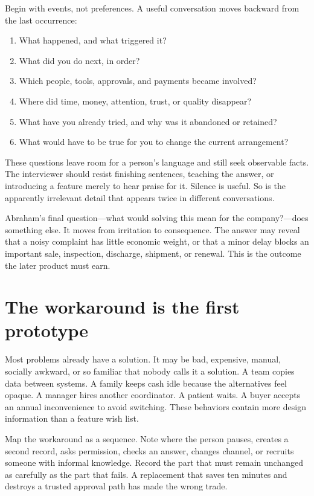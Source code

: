 Begin with events, not preferences. A useful conversation moves backward from
the last occurrence:

\begin{enumerate}[itemsep=0.2em]
\item What happened, and what triggered it?
\item What did you do next, in order?
\item Which people, tools, approvals, and payments became involved?
\item Where did time, money, attention, trust, or quality disappear?
\item What have you already tried, and why was it abandoned or retained?
\item What would have to be true for you to change the current arrangement?
\end{enumerate}

These questions leave room for a person's language and still seek observable
facts. The interviewer should resist finishing sentences, teaching the answer,
or introducing a feature merely to hear praise for it. Silence is useful. So is
the apparently irrelevant detail that appears twice in different conversations.

Abraham's final question---what would solving this mean for the company?---does
something else. It moves from irritation to consequence. The answer may reveal
that a noisy complaint has little economic weight, or that a minor delay blocks
an important sale, inspection, discharge, shipment, or renewal. This is the
outcome the later product must earn.

\section{The workaround is the first prototype}

Most problems already have a solution. It may be bad, expensive, manual,
socially awkward, or so familiar that nobody calls it a solution. A team copies
data between systems. A family keeps cash idle because the alternatives feel
opaque. A manager hires another coordinator. A patient waits. A buyer accepts
an annual inconvenience to avoid switching. These behaviors contain more
design information than a feature wish list.

Map the workaround as a sequence. Note where the person pauses, creates a
second record, asks permission, checks an answer, changes channel, or recruits
someone with informal knowledge. Record the part that must remain unchanged as
carefully as the part that fails. A replacement that saves ten minutes and
destroys a trusted approval path has made the wrong trade.

